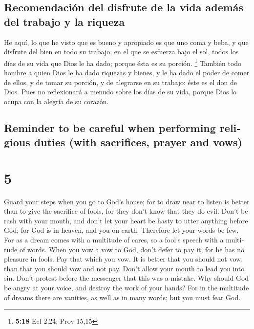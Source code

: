 \begin{paracol}{2}
{\subsection{Recomendación del disfrute de la vida además del trabajo y
la
riqueza}\label{recomendaciuxf3n-del-disfrute-de-la-vida-ademuxe1s-del-trabajo-y-la-riqueza}}

 He aquí, lo que he visto que es bueno y apropiado es que
uno coma y beba, y que disfrute del bien en todo su trabajo, en el que
se esfuerza bajo el sol, todos los días de su vida que Dios le ha dado;
porque ésta es su porción. \footnote{\textbf{5:18} Ecl 2,24; Prov 15,15}
 También todo hombre a quien Dios le ha dado riquezas y
bienes, y le ha dado el poder de comer de ellos, y de tomar su porción,
y de alegrarse en su trabajo: éste es el don de Dios. 
Pues no reflexionará a menudo sobre los días de su vida, porque Dios lo
ocupa con la alegría de su corazón.

\switchcolumn
\begin{otherlanguage}{english}

\hypertarget{reminder-to-be-careful-when-performing-religious-duties-with-sacrifices-prayer-and-vows}{%
\subsection{Reminder to be careful when performing religious duties
(with sacrifices, prayer and
vows)}\label{reminder-to-be-careful-when-performing-religious-duties-with-sacrifices-prayer-and-vows}}

\hypertarget{section-9}{%
\section{5}\label{section-9}}

 Guard your steps when you go to God's house; for to draw
near to listen is better than to give the sacrifice of fools, for they
don't know that they do evil.  Don't be rash with your
mouth, and don't let your heart be hasty to utter anything before God;
for God is in heaven, and you on earth. Therefore let your words be few.
 For as a dream comes with a multitude of cares, so a
fool's speech with a multitude of words.  When you vow a
vow to God, don't defer to pay it; for he has no pleasure in fools. Pay
that which you vow.  It is better that you should not vow,
than that you should vow and not pay.  Don't allow your
mouth to lead you into sin. Don't protest before the messenger that this
was a mistake. Why should God be angry at your voice, and destroy the
work of your hands?  For in the multitude of dreams there
are vanities, as well as in many words; but you must fear God.


\end{otherlanguage}
\end{paracol}
